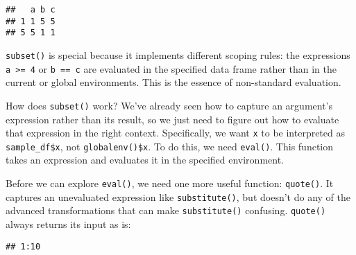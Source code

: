 \begin{Shaded}
\begin{Highlighting}[]

\OperatorTok{==}\StringTok{ }
\end{Highlighting}
\end{Shaded}

\begin{verbatim}
##   a b c
## 1 1 5 5
## 5 5 1 1
\end{verbatim}

\begin{Shaded}
\begin{Highlighting}[]
\end{Highlighting}
\end{Shaded}

\texttt{subset()} is special because it implements different scoping
rules: the expressions \texttt{a\ \textgreater{}=\ 4} or
\texttt{b\ ==\ c} are evaluated in the specified data frame rather than
in the current or global environments. This is the essence of
non-standard evaluation.

How does \texttt{subset()} work? We've already seen how to capture an
argument's expression rather than its result, so we just need to figure
out how to evaluate that expression in the right context. Specifically,
we want \texttt{x} to be interpreted as \texttt{sample\_df\$x}, not
\texttt{globalenv()\$x}. To do this, we need \texttt{eval()}. This
function takes an expression and evaluates it in the specified
environment. 

Before we can explore \texttt{eval()}, we need one more useful function:
\texttt{quote()}. It captures an unevaluated expression like
\texttt{substitute()}, but doesn't do any of the advanced
transformations that can make \texttt{substitute()} confusing.
\texttt{quote()} always returns its input as is: 

\begin{Shaded}
\begin{Highlighting}[]
\NormalTok{(}\OperatorTok{:}\NormalTok{)}
\end{Highlighting}
\end{Shaded}

\begin{verbatim}
## 1:10
\end{verbatim}

